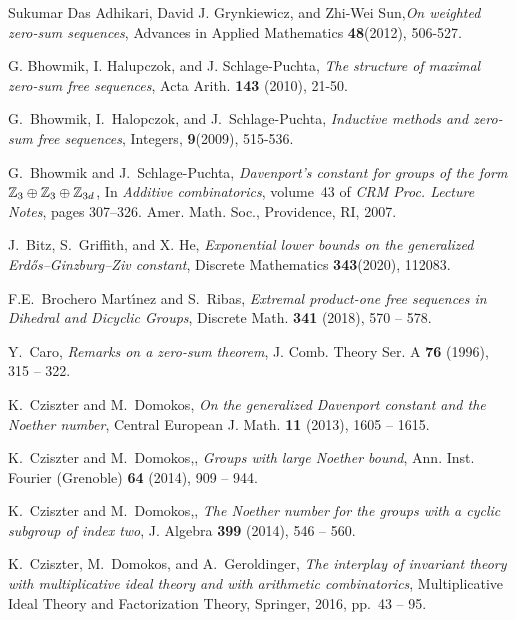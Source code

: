 \documentclass[11pt]{amsart}
\theoremstyle{definition}
\numberwithin{equation}{section}
\begin{document}
\begin{thebibliography}{99}
Sukumar Das Adhikari,  David J. Grynkiewicz, and Zhi-Wei Sun,\emph{On weighted zero-sum sequences}, Advances in Applied Mathematics \textbf{48}(2012), 506-527.	
	



 G. Bhowmik, I. Halupczok, and J.
Schlage-Puchta,
\emph{The structure of maximal zero-sum free sequences},
Acta Arith. \textbf{143} (2010), 21-50.


G.~Bhowmik, I.~Halopczok, and J.~Schlage-Puchta,
\emph{Inductive methods and zero-sum free sequences},
 Integers, \textbf{9}(2009), 515-536.


G.~Bhowmik and J.~Schlage-Puchta,
\emph{Davenport's constant for groups of the form {$\mathbb Z\sb 3\oplus\mathbb
	Z\sb 3\oplus\mathbb Z\sb {3d}$}},
 In {\em Additive combinatorics}, volume~43 of {\em CRM Proc. Lecture
	Notes}, pages 307--326. Amer. Math. Soc., Providence, RI, 2007.

J.~Bitz, S.~Griffith, and X. He, \emph{Exponential lower bounds on the generalized Erdős–Ginzburg–Ziv constant}, Discrete Mathematics \textbf{343}(2020), 112083.

F.E.~Brochero Mart\'\i nez and S.~Ribas, \emph{{E}xtremal product-one free sequences in {D}ihedral and {D}icyclic {G}roups}, Discrete Math. \textbf{341} (2018), 570 -- 578.



Y.~Caro, \emph{Remarks on a zero-sum theorem}, J. Comb. Theory Ser. A \textbf{76} (1996), 315 -- 322.


K.~Cziszter and M.~Domokos, \emph{On the generalized {D}avenport constant and the {N}oether number}, Central European J. Math. \textbf{11} (2013), 1605 -- 1615.


K.~Cziszter and M.~Domokos,, \emph{Groups with large {N}oether bound}, Ann. Inst. Fourier (Grenoble) \textbf{64} (2014), 909 -- 944.


K.~Cziszter and M.~Domokos,, \emph{The {N}oether number for the groups with a cyclic subgroup of index two}, J. Algebra \textbf{399} (2014), 546 -- 560.


K.~Cziszter, M.~Domokos, and A.~Geroldinger, \emph{The interplay of invariant theory with multiplicative ideal theory and with arithmetic combinatorics}, Multiplicative {I}deal {T}heory and {F}actorization {T}heory, Springer, 2016, pp.~43 -- 95.



\end{thebibliography}
\end{document}
